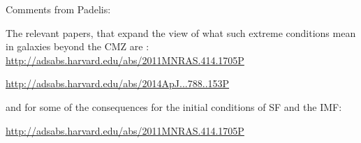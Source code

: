 Comments from Padelis:

The relevant papers, that expand the view of what such extreme conditions mean in galaxies
 beyond the CMZ are :
\url{http://adsabs.harvard.edu/abs/2011MNRAS.414.1705P}

\url{http://adsabs.harvard.edu/abs/2014ApJ...788..153P}


and for some of the consequences for the initial conditions of SF
and the IMF:

\url{http://adsabs.harvard.edu/abs/2011MNRAS.414.1705P}
